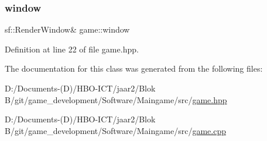 \subsubsection{\texorpdfstring{window}{window}}
{\footnotesize\ttfamily sf\+::\+Render\+Window\& game\+::window\hspace{0.3cm}{\ttfamily [private]}}



Definition at line 22 of file game.\+hpp.



The documentation for this class was generated from the following files\+:\begin{DoxyCompactItemize}
\item 
D\+:/\+Documents-\/(\+D)/\+H\+B\+O-\/\+I\+C\+T/jaar2/\+Blok B/git/game\+\_\+development/\+Software/\+Maingame/src/\hyperlink{game_8hpp}{game.\+hpp}\item 
D\+:/\+Documents-\/(\+D)/\+H\+B\+O-\/\+I\+C\+T/jaar2/\+Blok B/git/game\+\_\+development/\+Software/\+Maingame/src/\hyperlink{game_8cpp}{game.\+cpp}\end{DoxyCompactItemize}
